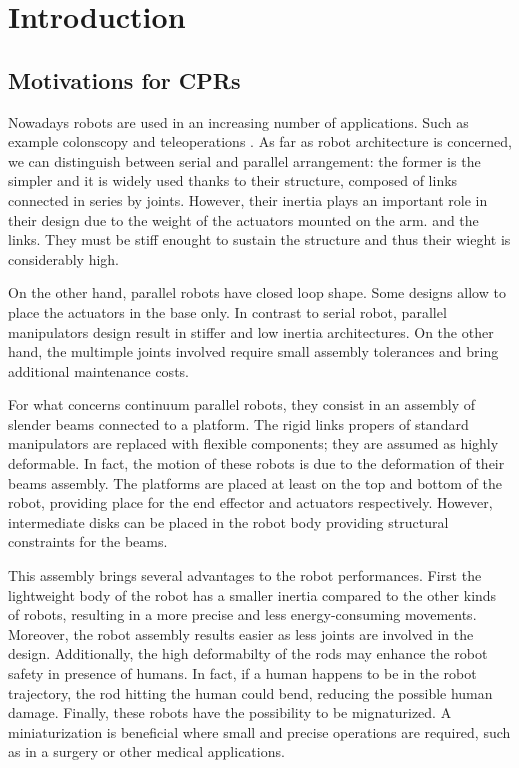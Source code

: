 \documentclass{thesisreport}
\begin{document}
 
 \chapter*{Introduction}
 \section{Motivations for CPRs}
  Nowadays robots are used in an increasing number of applications. Such as example colonscopy \cite{black_modeling_2017} and teleoperations \cite{till_efficient_2015}.
 As far as robot architecture is concerned, we can distinguish between serial and parallel arrangement: the former is the simpler and it is widely used thanks to their structure, composed of links connected in series by joints. However, their inertia plays an important role in their design due to the weight of the actuators mounted on the arm. and the links. They must be stiff enought to sustain the structure and thus their wieght is considerably high.
 
 On the other hand, parallel robots have closed loop shape. Some designs allow to place the actuators in the base only. In contrast to serial robot, parallel manipulators design result in stiffer and low inertia architectures. On the other hand, the multimple joints involved require small assembly tolerances and bring additional maintenance costs.
 
 For what concerns continuum parallel robots, they consist in an assembly of slender beams connected to a platform. The rigid links propers of standard manipulators are replaced with flexible components; they are assumed as highly deformable. In fact, the motion of these robots is due to the deformation of their beams assembly.
 The platforms are placed at least on the top and bottom of the robot, providing place for the end effector and actuators respectively. However, intermediate disks can be placed in the robot body providing structural constraints for the beams.  
 
 This assembly brings several advantages to the robot performances. First the lightweight body of the robot has a smaller inertia compared to the other kinds of robots, resulting in a more precise and less energy-consuming movements. Moreover, the robot assembly results easier as less joints are involved in the design. Additionally, the high deformabilty of the rods may enhance the robot safety in presence of humans. In fact, if a human happens to be in the robot trajectory, the rod hitting the human could bend, reducing the possible human damage. Finally, these robots have the possibility to be mignaturized. A miniaturization is beneficial where small and precise operations are required, such as in a surgery or other medical applications. 
 
\end{document}
